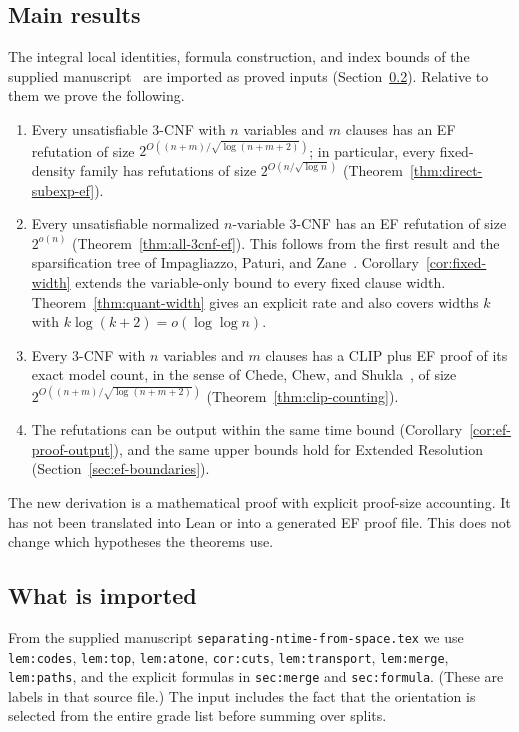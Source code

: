 \documentclass[11pt]{article}
\theoremstyle{definition}
\theoremstyle{remark}
\begin{document}
\subsection{Main results}

The integral local identities, formula construction, and index bounds
of the supplied manuscript~\cite{cruz-ntime} are imported as proved
inputs (Section~\ref{sec:imported}). Relative to them we prove the
following.
\begin{enumerate}
\item Every unsatisfiable 3-CNF with $n$ variables and $m$ clauses
has an EF refutation of size $2^{O((n+m)/\sqrt{\log(n+m+2)})}$; in
particular, every fixed-density family has refutations of size
$2^{O(n/\sqrt{\log n})}$ (Theorem~\ref{thm:direct-subexp-ef}).
\item Every unsatisfiable normalized $n$-variable 3-CNF has an EF
refutation of size $2^{o(n)}$ (Theorem~\ref{thm:all-3cnf-ef}). This
follows from the first result and the sparsification tree of
Impagliazzo, Paturi, and Zane~\cite{ipz}. Corollary~\ref{cor:fixed-width}
extends the variable-only bound to every fixed clause width.
Theorem~\ref{thm:quant-width} gives an explicit rate and also covers
widths $k$ with $k\log(k+2)=o(\log\log n)$.
\item Every 3-CNF with $n$ variables and $m$ clauses has a CLIP plus
EF proof of its exact model count, in the sense of Chede, Chew, and
Shukla~\cite{ccs}, of size $2^{O((n+m)/\sqrt{\log(n+m+2)})}$
(Theorem~\ref{thm:clip-counting}).
\item The refutations can be output within the same time bound
(Corollary~\ref{cor:ef-proof-output}), and the same upper bounds hold
for Extended Resolution (Section~\ref{sec:ef-boundaries}).
\end{enumerate}
The new derivation is a mathematical proof with explicit proof-size
accounting. It has not been translated into Lean or into a generated
EF proof file. This does not change which hypotheses the theorems use.

\subsection{What is imported}
\label{sec:imported}

From the supplied manuscript \texttt{separating-ntime-from-space.tex}
\cite{cruz-ntime} we use \texttt{lem:codes}, \texttt{lem:top},
\texttt{lem:atone}, \texttt{cor:cuts}, \texttt{lem:transport},
\texttt{lem:merge}, \texttt{lem:paths}, and the explicit formulas in
\texttt{sec:merge} and \texttt{sec:formula}. (These are labels in that
source file.) The input includes the fact that the orientation is
selected from the entire grade list before summing over splits.
\end{document}
